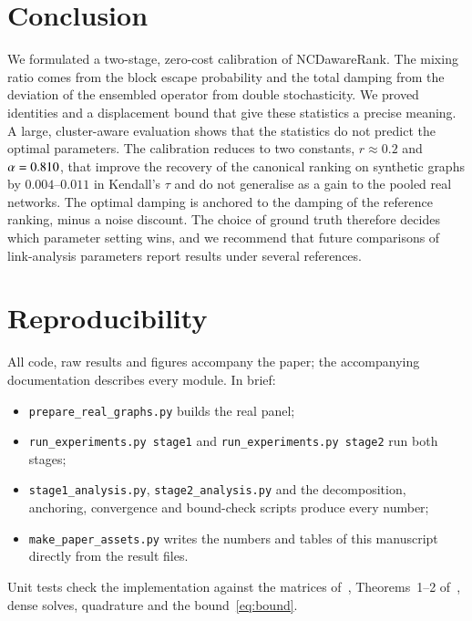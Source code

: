 \documentclass[11pt,a4paper]{article}
\theoremstyle{definition}
\theoremstyle{remark}
\begin{document}
\section{Conclusion}
\label{sec:conclusion}

We formulated a two-stage, zero-cost calibration of NCDawareRank. The mixing ratio comes from the block
escape probability and the total damping from the deviation of the ensembled operator from double
stochasticity. We proved identities and a displacement bound that give these statistics a precise
meaning. A large, cluster-aware evaluation shows that the statistics do not predict the optimal
parameters. The calibration reduces to two constants, $r\approx0.2$ and $\alpha=0.810$, that
improve the recovery of the canonical ranking on synthetic graphs by $0.004$--$0.011$ in Kendall's $\tau$
and do not generalise as a gain to the pooled real networks. The optimal damping is anchored to the damping of the reference ranking,
minus a noise discount. The choice of ground truth therefore decides which parameter setting wins, and
we recommend that future comparisons of link-analysis parameters report results under several
references.

\section*{Reproducibility}
All code, raw results and figures accompany the paper; the accompanying documentation describes every
module. In brief:
\begin{itemize}[leftmargin=1.4em,itemsep=0pt]
\item \texttt{prepare\_real\_graphs.py} builds the real panel;
\item \texttt{run\_experiments.py stage1} and \texttt{run\_experiments.py stage2} run both stages;
\item \texttt{stage1\_analysis.py}, \texttt{stage2\_analysis.py} and the decomposition, anchoring,
convergence and bound-check scripts produce every number;
\item \texttt{make\_paper\_assets.py} writes the numbers and tables of this manuscript directly from the
result files.
\end{itemize}
Unit tests check the implementation against the matrices of~\cite[Fig.~1]{ng13}, Theorems~1--2
of~\cite{ng13}, dense solves, quadrature and the bound~\eqref{eq:bound}.
\end{document}
